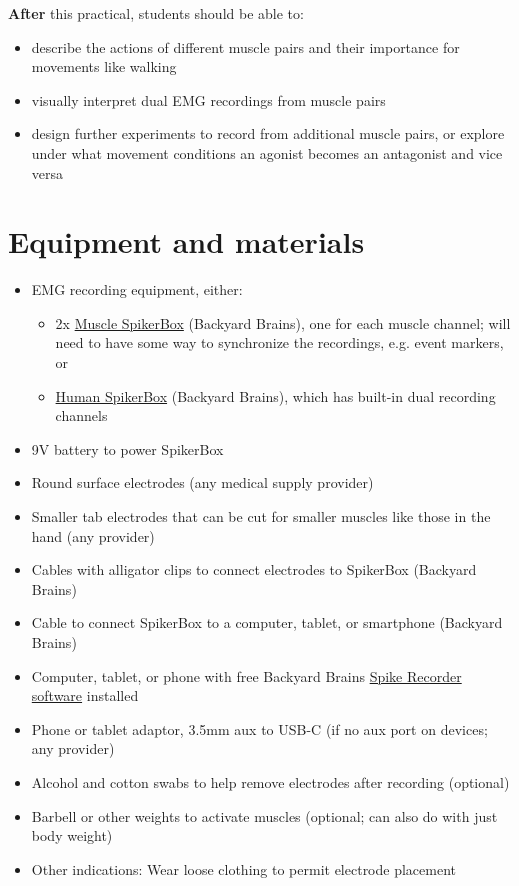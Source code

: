 \documentclass{article}
\begin{document}
\textbf{After} this practical, students should be able to:

\begin{itemize}
\item describe the actions of different muscle pairs and their importance for movements like walking
\item visually interpret dual EMG recordings from muscle pairs
\item design further experiments to record from additional muscle pairs, or explore under what movement conditions an agonist becomes an antagonist and vice versa
\end{itemize}

\section{Equipment and materials}

\begin{itemize}
\item EMG recording equipment, either:\begin{itemize}
\item 2x \href{https://backyardbrains.com/products/muscle-spikerbox}{Muscle SpikerBox} (Backyard Brains), one for each muscle channel; will need to have some way to synchronize the recordings, e.g. event markers, or
\item \href{https://backyardbrains.com/products/human-spikerbox}{Human SpikerBox} (Backyard Brains), which has built-in dual recording channels
\end{itemize}


\item 9V battery to power SpikerBox
\item Round surface electrodes (any medical supply provider)
\item Smaller tab electrodes that can be cut for smaller muscles like those in the hand (any provider)
\item Cables with alligator clips to connect electrodes to SpikerBox (Backyard Brains)
\item Cable to connect SpikerBox to a computer, tablet, or smartphone (Backyard Brains)
\item Computer, tablet, or phone with free Backyard Brains \href{https://backyardbrains.com/products/byb-spike-recorder}{Spike Recorder software} installed
\item Phone or tablet adaptor, 3.5mm aux to USB-C (if no aux port on devices; any provider)
\item Alcohol and cotton swabs to help remove electrodes after recording (optional)
\item Barbell or other weights to activate muscles (optional; can also do with just body weight)
\item Other indications: Wear loose clothing to permit electrode placement
\end{itemize}
\end{document}
